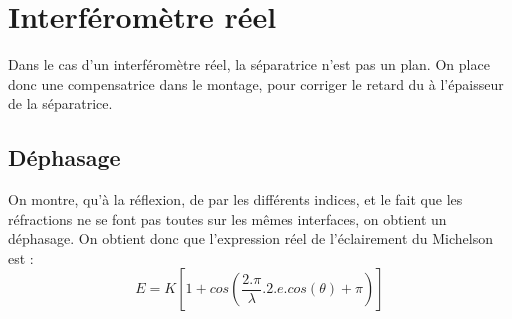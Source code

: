 \section{Interféromètre réel}
Dans le cas d'un interféromètre réel, la séparatrice n'est pas un plan. On place donc une compensatrice dans le montage, pour corriger le retard du à l'épaisseur de la séparatrice.
\subsection{Déphasage}
On montre, qu'à la réflexion, de par les différents indices, et le fait que les réfractions ne se font pas toutes sur les mêmes interfaces, on obtient un déphasage. On obtient donc que l'expression réel de l'éclairement du Michelson est : 
$$E = K[1 + cos(\dfrac{2.\pi}{\lambda}.2.e.cos(\theta) + \pi)]$$